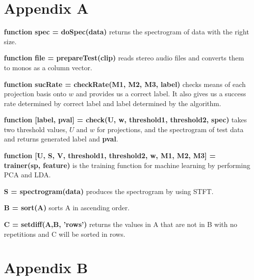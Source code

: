 \documentclass[10pt]{article}
\begin{document}
\section{Appendix A}
\noindent
\textbf{function spec = doSpec(data)} returns the spectrogram of data with the right size.
\par
\vskip 0.2cm
\noindent
\textbf{function file = prepareTest(clip)} reads stereo audio files and converts them to monos as a column vector.
\par
\vskip 0.2cm
\noindent
\textbf{function sucRate = checkRate(M1, M2, M3, label)} checks means of each projection basis onto $w$ and provides us a correct label. It also gives us a success rate determined by correct label and label determined by the algorithm.
\par
\vskip 0.2cm
\noindent
\textbf{function [label, pval] = check(U, w, threshold1, threshold2, spec)} takes two threshold values, $U$ and $w$ for projections, and the spectrogram of test data and returns generated label and \textbf{pval}.
\par
\vskip 0.2cm
\noindent
\textbf{function [U, S, V, threshold1, threshold2, w, M1, M2, M3] = trainer(sp, feature)} is the training function for machine learning by performing PCA and LDA.
\par
\vskip 0.2cm
\noindent
\textbf{S = spectrogram(data)} produces the spectrogram by using STFT.
\par
\vskip 0.2cm
\noindent
\textbf{B = sort(A)} sorts A in ascending order.
\par
\vskip 0.2cm
\noindent
\textbf{C = setdiff(A,B, 'rows')} returns the values in A that are not in B with no repetitions and C will be sorted in rows.

\newpage

\section{Appendix B}

\end{document}
